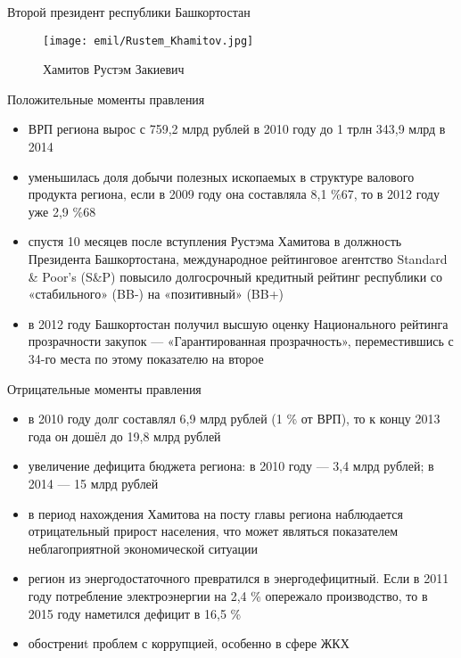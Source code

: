 \begin{frame}{Второй президент республики Башкортостан}

\begin{figure}[h!]
	\begin{center}
		{\texttt{[image: emil/Rustem\_Khamitov.jpg]}}
		\caption{Хамитов Рустэм Закиевич}
	\end{center}
\end{figure}

\end{frame}

\begin{frame}{Положительные моменты правления}

\begin{itemize}
	\item  ВРП региона вырос с 759,2 млрд рублей в 2010 году до 1 трлн 343,9 млрд в 2014
	\item уменьшилась доля добычи полезных ископаемых в структуре валового продукта региона, если в 2009 году она составляла 8,1 \%67, то в 2012 году уже 2,9 \%68
	\item спустя 10 месяцев после вступления Рустэма Хамитова в должность Президента Башкортостана, международное рейтинговое агентство Standard \& Poor’s (S\&P) повысило долгосрочный кредитный рейтинг республики со «стабильного» (BB-) на «позитивный» (BB+)
	\item в 2012 году Башкортостан получил высшую оценку Национального рейтинга прозрачности закупок — «Гарантированная прозрачность», переместившись с 34-го места по этому показателю на второе
\end{itemize}
\end{frame}

\begin{frame}{Отрицательные моменты правления}

\begin{itemize}
	\item  в 2010 году долг составлял 6,9 млрд рублей (1 \% от ВРП), то к концу 2013 года он дошёл до 19,8 млрд рублей
	\item увеличение дефицита бюджета региона: в 2010 году — 3,4 млрд рублей; в 2014 — 15 млрд рублей
	\item  в период нахождения Хамитова на посту главы региона наблюдается отрицательный прирост населения, что может являться показателем неблагоприятной экономической ситуации
	\item регион из энергодостаточного превратился в энергодефицитный. Если в 2011 году потребление электроэнергии на 2,4 \% опережало производство, то в 2015 году наметился дефицит в 16,5 \%
	\item обострениt проблем с коррупцией, особенно в сфере ЖКХ
\end{itemize}

\end{frame}
